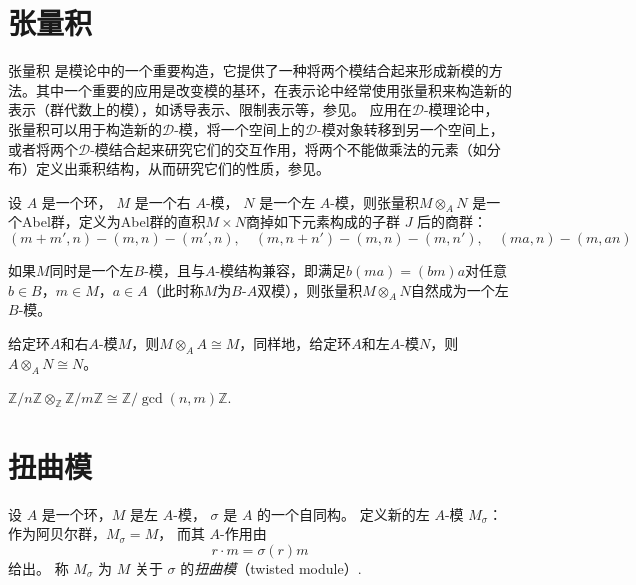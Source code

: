 \documentclass[12pt,a4paper]{ctexrep}   %
\begin{document}
\section{张量积}
张量积 是模论中的一个重要构造，它提供了一种将两个模结合起来形成新模的方法。其中一个重要的应用是改变模的基环，在表示论中经常使用张量积来构造新的表示（群代数上的模），如诱导表示、限制表示等，参见\cite{serre1977linear}。
应用在$\mathcal{D}$-模理论中，张量积可以用于构造新的$\mathcal{D}$-模，将一个空间上的$\mathcal{D}$-模对象转移到另一个空间上，或者将两个$\mathcal{D}$-模结合起来研究它们的交互作用，将两个不能做乘法的元素（如分布）定义出乘积结构，从而研究它们的性质，参见\cite{bernshtein1972analytic}。



\begin{definition}
    设 $A$ 是一个环， $M$ 是一个右 $A$-模， $N$ 是一个左 $A$-模，则张量积$M\otimes_A N$ 是一个Abel群，定义为Abel群的直积$M\times N$商掉如下元素构成的子群 $J$ 后的商群：
    \begin{equation*}
        (m+m',n)-(m,n)-(m',n),\quad (m,n+n')-(m,n)-(m,n'),\quad (ma,n)-(m,an)
    \end{equation*}
\end{definition}
\begin{remark}
    如果$M$同时是一个左$B$-模，且与$A$-模结构兼容，即满足$b(ma)=(bm)a$对任意$b\in B$，$m\in M$，$a\in A$（此时称$M$为$B$-$A$双模），则张量积$M\otimes_A N$自然成为一个左$B$-模。
\end{remark}

\begin{example}
    给定环$A$和右$A$-模$M$，则$M\otimes_A A\cong M$，同样地，给定环$A$和左$A$-模$N$，则$A\otimes_A N\cong N$。
\end{example}
\begin{example}
    $\mathbb{Z}/n\mathbb{Z}\otimes_{\mathbb{Z}} \mathbb{Z}/m\mathbb{Z} \cong \mathbb{Z}/\gcd(n,m)\mathbb{Z}$.
\end{example}

\section{扭曲模}

\begin{definition}
    设 $A$ 是一个环，$M$ 是左 $A$-模，
    $\sigma$ 是 $A$ 的一个自同构。
    定义新的左 $A$-模 $M_\sigma$：
    作为阿贝尔群，$M_\sigma=M$，
    而其 $A$-作用由
    \[
        r\cdot m=\sigma(r)m
    \]
    给出。
    称 $M_\sigma$ 为 $M$ 关于 $\sigma$ 的\emph{扭曲模}（twisted module）.
\end{definition}
\end{document}
